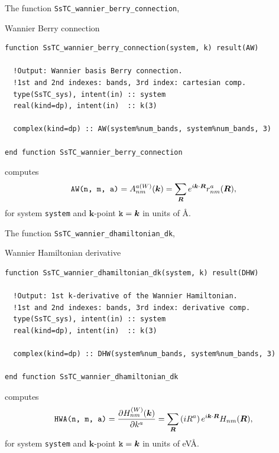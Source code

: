 \documentclass[10pt,a4paper]{article}
\begin{document}
The function \verb|SsTC_wannier_berry_connection|,
\begin{codebox}{Wannier Berry connection}
\begin{lstlisting}[caption={Interface of ``Wannier Berry connection".},captionpos=b]
function SsTC_wannier_berry_connection(system, k) result(AW)

  !Output: Wannier basis Berry connection.
  !1st and 2nd indexes: bands, 3rd index: cartesian comp.
  type(SsTC_sys), intent(in) :: system
  real(kind=dp), intent(in)  :: k(3)

  complex(kind=dp) :: AW(system%num_bands, system%num_bands, 3)

end function SsTC_wannier_berry_connection
\end{lstlisting}
\end{codebox}
computes
\begin{equation}
\verb|AW(n, m, a)| = A_{nm}^{a(W)}(\bm{k}) = \sum_{\bm{R}} e^{i\bm{k}\cdot\bm{R}} r^a_{nm}(\bm{R}),
\end{equation}
for system \verb|system| and $\bm{k}$-point $\verb|k| = \bm{k}$ in units of \r{A}.

The function \verb|SsTC_wannier_dhamiltonian_dk|,
\begin{codebox}{Wannier Hamiltonian derivative}
\begin{lstlisting}[caption={Interface of ``Wannier Hamiltonian's derivative".},captionpos=b]
function SsTC_wannier_dhamiltonian_dk(system, k) result(DHW)

  !Output: 1st k-derivative of the Wannier Hamiltonian.
  !1st and 2nd indexes: bands, 3rd index: derivative comp.
  type(SsTC_sys), intent(in) :: system
  real(kind=dp), intent(in)  :: k(3)

  complex(kind=dp) :: DHW(system%num_bands, system%num_bands, 3)

end function SsTC_wannier_dhamiltonian_dk
\end{lstlisting}
\end{codebox}
computes
\begin{equation}
\verb|HWA(n, m, a)| = \frac{\partial H_{nm}^{(W)}(\bm{k})}{\partial k^a} = \sum_{\bm{R}}\left(iR^a \right) e^{i\bm{k}\cdot\bm{R}} H_{nm}(\bm{R}),
\end{equation}
for system \verb|system| and $\bm{k}$-point $\verb|k| = \bm{k}$ in units of eV\r{A}.
\end{document}
